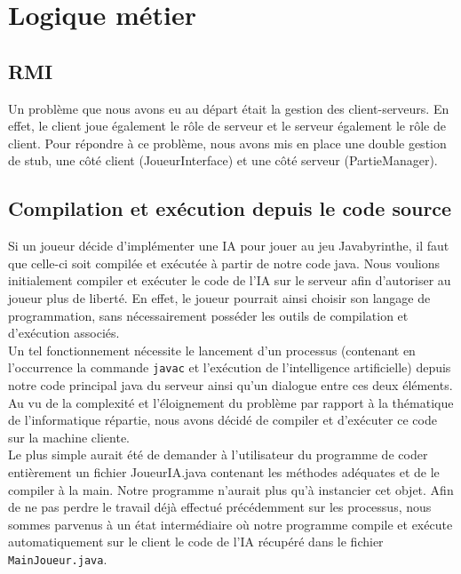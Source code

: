 \section{Logique métier}

    \subsection{RMI}
        Un problème que nous avons eu au départ était la gestion des client-serveurs. En effet, le client joue également le rôle de serveur et le serveur également le rôle de client. Pour répondre à ce problème, nous avons mis en place une double gestion de stub, une côté client (JoueurInterface) et une côté serveur (PartieManager).

    \subsection{Compilation et exécution depuis le code source}
	\label{problemes_IA}

        Si un joueur décide d'implémenter une IA pour jouer au jeu Javabyrinthe, il faut que celle-ci soit compilée et exécutée à partir de notre code java. Nous voulions initialement compiler et exécuter le code de l'IA sur le serveur afin d'autoriser au joueur plus de liberté. En effet, le joueur pourrait ainsi choisir son langage de programmation, sans nécessairement posséder les outils de compilation et d'exécution associés. \\

		Un tel fonctionnement nécessite le lancement d'un processus (contenant en l'occurrence la commande \texttt{javac} et l'exécution de l'intelligence artificielle) depuis notre code principal java du serveur ainsi qu'un dialogue entre ces deux éléments. Au vu de la complexité et l'éloignement du problème par rapport à la thématique de l'informatique répartie, nous avons décidé de compiler et d'exécuter ce code sur la machine cliente. \\

		Le plus simple aurait été de demander à l'utilisateur du programme de coder entièrement un fichier JoueurIA.java contenant les méthodes adéquates et de le compiler à la main. Notre programme n'aurait plus qu'à instancier cet objet. Afin de ne pas perdre le travail déjà effectué précédemment sur les processus, nous sommes parvenus à un état intermédiaire où notre programme compile et exécute automatiquement sur le client le code de l'IA récupéré dans le fichier \texttt{MainJoueur.java}.

